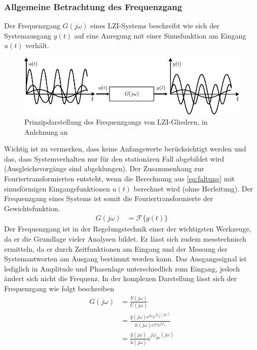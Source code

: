 \subsubsection{Allgemeine Betrachtung des Frequenzgang}
%
Der Frequenzgang $G(j\omega)$ eines LZI-Systems beschreibt wie sich der Systemausgang $y(t)$ auf eine Anregung mit einer Sinusfunktion am Eingang $u(t)$ verhält. 
%
\begin{figure}[h]
	\centering
	\includegraphics[width=1\linewidth]{Abbildungen/Modellbildung/PDF/Frequenzgang.pdf}
	\caption{Prinzipdarstellung des Frequenzgangs von LZI-Gliedern, in Anlehnung an \cite{Lunze10}}
	\label{fig:frequenzgang}
\end{figure}  
%
Wichtig ist zu vermerken, dass keine Anfangswerte berücksichtigt werden und das, dass Systemverhalten nur für den stationären Fall abgebildet wird (Ausgleichsvorgänge sind abgeklungen). Der Zusammenhang zur Fouriertransformierten entsteht, wenn die Berechnung aus \eqref{eq:faltung} mit sinusförmigen Eingangsfunktionen $u(t)$ berechnet wird (ohne Herleitung). Der Frequenzgang eines Systems ist somit die Fouriertransformierte der Gewichtsfunktion.
%
\begin{equation*}
\begin{aligned}
G(j\omega)&=\mathcal{F}\{g(t)\}
\end{aligned}
\end{equation*}
%
Der Frequenzgang ist in der Regelungstechnik einer der wichtigsten Werkzeuge, da er die Grundlage vieler Analysen bildet. Er lässt sich zudem messtechnisch ermitteln, da er durch Zeitfunktionen am Eingang und der Messung der Systemantworten am Ausgang bestimmt werden kann. Das Ausgangssignal ist lediglich in Amplitude und Phasenlage unterschiedlich zum Eingang, jedoch ändert sich nicht die Frequenz. In der komplexen Darstellung lässt sich der Frequenzgang wie folgt beschreiben
%
\begin{equation*}
\begin{aligned}
G(j\omega)&=\frac{Y(j\omega)}{U(j\omega)}\\
&=\frac{\hat{y}(j\omega)e^{j\omega}e^{j\varphi_{y}(j\omega)}}{\hat{u}(j\omega)e^{j\omega}e^{j\varphi_{u}}}\\
&=\frac{\hat{y}(j\omega)}{\hat{u}(j\omega)}e^{j\varphi_{yu}(j\omega)}
\end{aligned}
\end{equation*}
